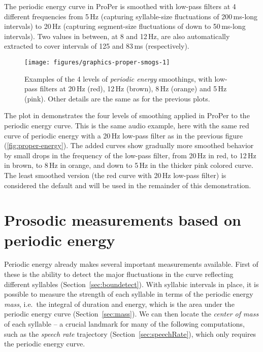 The periodic energy curve in ProPer is smoothed with low-pass filters at 4 different frequencies from 5\,Hz (capturing syllable-size fluctuations of 200\,ms-long intervals) to 20\,Hz (capturing segment-size fluctuations of down to 50\,ms-long intervals). Two values in between, at 8 and 12\,Hz, are also automatically extracted to cover intervals of 125 and 83\,ms (respectively).



\begin{figure}
\texttt{[image: figures/graphics-proper-smogs-1]}
\caption{Examples of the 4 levels of \emph{periodic energy} smoothings, with low-pass filters at 20\,Hz (red), 12\,Hz (brown), 8\,Hz (orange) and 5\,Hz (pink). Other details are the same as for the previous plots.}\label{fig:proper-smogs}
\end{figure}

The plot in  demonstrates the four levels of smoothing applied in ProPer to the periodic energy curve. This is the same audio example, here with the same red curve of periodic energy with a 20\,Hz low-pass filter as in the previous figure (\ref{fig:proper-energy}). The added curves show gradually more smoothed behavior by small drops in the frequency of the low-pass filter, from 20\,Hz in red, to 12\,Hz in brown, to 8\,Hz in orange, and down to 5\,Hz in the thicker pink colored curve. The least smoothed version (the red curve with 20\,Hz low-pass filter) is considered the default and will be used in the remainder of this demonstration.

\section{Prosodic measurements based on periodic energy}\label{sec:peronly}

Periodic energy already makes several important measurements available. First of these is the ability to detect the major fluctuations in the curve reflecting different syllables (Section~\ref{sec:boundetect}). With syllabic intervals in place, it is possible to measure the strength of each syllable in terms of the periodic energy \emph{mass}, i.e.~the integral of duration and energy, which is the area under the periodic energy curve (Section~\ref{sec:mass}). We can then locate the \emph{center of mass} of each syllable -- a crucial landmark for many of the following computations, such as the \emph{speech rate} trajectory (Section~\ref{sec:speechRate}), which only requires the periodic energy curve.

